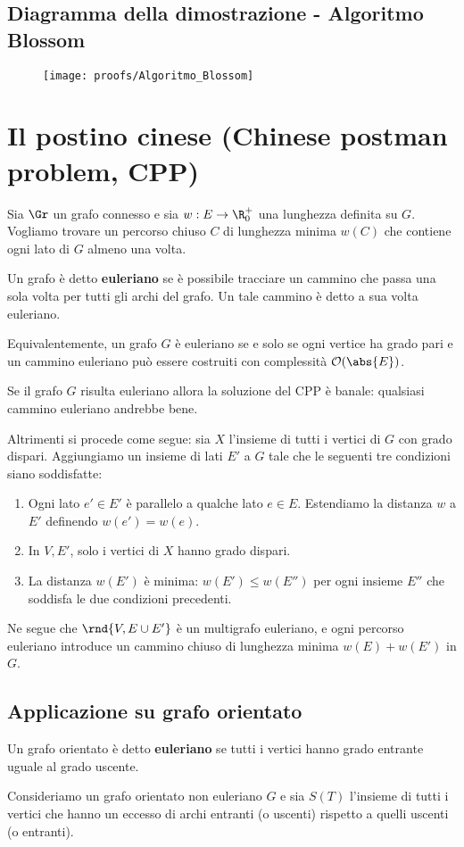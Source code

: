 \documentclass[\main/main.tex]{subfiles}
\begin{document}
\subsection{Diagramma della dimostrazione - Algoritmo Blossom}
\begin{figure}
	\texttt{[image: proofs/Algoritmo\_Blossom]}
\end{figure}
\clearpage
\section{Il postino cinese (Chinese postman problem, CPP)}
Sia \(\Gr \) un grafo connesso e sia \(w: E \rightarrow \R^+_0\) una lunghezza definita su \(G\). Vogliamo trovare un percorso chiuso \(C\) di lunghezza minima \(w(C)\) che contiene ogni lato di \(G\) almeno una volta.
\begin{definition}
	Un grafo è detto \textbf{euleriano} se è possibile tracciare un cammino che passa una sola volta per tutti gli archi del grafo. Un tale cammino è detto a sua volta euleriano.

	Equivalentemente, un grafo \(G\) è euleriano se e solo se ogni vertice ha grado pari e un cammino euleriano può essere costruiti con complessità \(\mathcal{O}(\abs{E})\).
\end{definition}
Se il grafo \(G\) risulta euleriano allora la soluzione del CPP è banale: qualsiasi cammino euleriano andrebbe bene.

Altrimenti si procede come segue: sia \(X\) l'insieme di tutti i vertici di \(G\) con grado dispari. Aggiungiamo un insieme di lati \(E'\) a \(G\) tale che le seguenti tre condizioni siano soddisfatte:
\begin{enumerate}
	\item Ogni lato \(e' \in E'\) è parallelo a qualche lato \(e \in E\). Estendiamo la distanza \(w\) a \(E'\) definendo \(w(e') = w(e)\).
	\item In \(V, E'\), solo i vertici di \(X\) hanno grado dispari.
	\item La distanza \(w(E')\) è minima: \(w(E') \leq w(E'')\) per ogni insieme \(E''\) che soddisfa le due condizioni precedenti.
\end{enumerate}
Ne segue che \(\rnd{V, E \cup E'}\) è un multigrafo euleriano, e ogni percorso euleriano introduce un cammino chiuso di lunghezza minima \(w(E) + w(E')\) in \(G\).

\subsection{Applicazione su grafo orientato}
\begin{definition}
	Un grafo orientato è detto \textbf{euleriano} se tutti i vertici hanno grado entrante uguale al grado uscente.
\end{definition}
Consideriamo un grafo orientato non euleriano \(G\) e sia \(S(T)\) l'insieme di tutti i vertici che hanno un eccesso di archi entranti (o uscenti) rispetto a quelli uscenti (o entranti).
\end{document}
